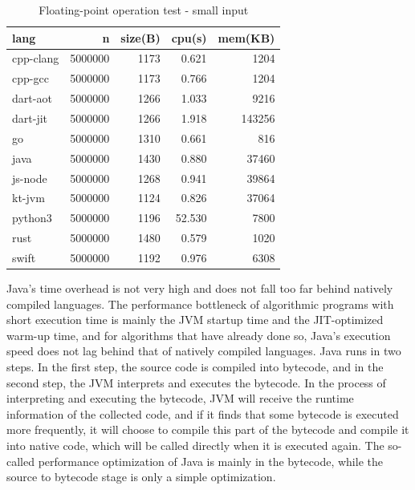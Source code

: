 \begin{table}[htbp]
    \caption{Floating-point operation test - small input}
    \label{tab:n-body-2}
    \begin{center}
        \begin{tabular}{lrrrr}
            \toprule
            lang      & n       & size(B) & cpu(s) & mem(KB) \\
            \midrule
            cpp-clang & 5000000 & 1173    & 0.621  & 1204    \\
            cpp-gcc   & 5000000 & 1173    & 0.766  & 1204    \\
            dart-aot  & 5000000 & 1266    & 1.033  & 9216    \\
            dart-jit  & 5000000 & 1266    & 1.918  & 143256  \\
            go        & 5000000 & 1310    & 0.661  & 816     \\
            java      & 5000000 & 1430    & 0.880  & 37460   \\
            js-node   & 5000000 & 1268    & 0.941  & 39864   \\
            kt-jvm    & 5000000 & 1124    & 0.826  & 37064   \\
            python3   & 5000000 & 1196    & 52.530 & 7800    \\
            rust      & 5000000 & 1480    & 0.579  & 1020    \\
            swift     & 5000000 & 1192    & 0.976  & 6308    \\
            \bottomrule
        \end{tabular}
    \end{center}
\end{table}

Java's time overhead is not very high and does not fall too far behind natively compiled languages. The performance bottleneck of algorithmic programs with short execution time is mainly the JVM startup time and the JIT-optimized warm-up time, and for algorithms that have already done so, Java's execution speed does not lag behind that of natively compiled languages. Java runs in two steps. In the first step, the source code is compiled into bytecode, and in the second step, the JVM interprets and executes the bytecode. In the process of interpreting and executing the bytecode, JVM will receive the runtime information of the collected code, and if it finds that some bytecode is executed more frequently, it will choose to compile this part of the bytecode and compile it into native code, which will be called directly when it is executed again. The so-called performance optimization of Java is mainly in the bytecode, while the source to bytecode stage is only a simple optimization.

